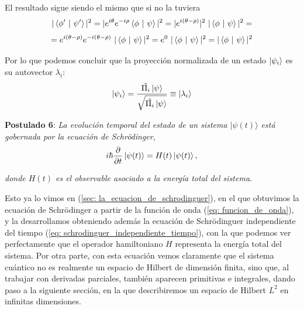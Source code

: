 \documentclass[12pt]{article}
\numberwithin{equation}{section} %
\begin{document}
    \vspace{2.5mm}

    El resultado sigue siendo el mismo que si no la tuviera
    \begin{equation*}
        | \braket{\phi' \ | \ \psi'} | ^ {2} = | e^{i \theta} e^{-i \rho} \braket{\phi \ | \ \psi} | ^ {2} = | e^{i (\theta - \rho)} | ^ {2} \ | \braket{\phi \ | \ \psi} | ^ {2} =
    \end{equation*}
    \begin{equation*}
        = e^{i (\theta - \rho)} e^{-i(\theta - \rho)} \ | \braket{\phi \ | \ \psi} | ^ {2} = e^{0} \ | \braket{\phi \ | \ \psi} | ^ {2} = | \braket{\phi \ | \ \psi} | ^ {2}
    \end{equation*}

    \vspace{2.5mm}

    Por lo que podemos concluir que la proyección normalizada de un estado \( \ket{\psi_{i}} \) es su autovector \( \lambda_{i} \):
    \begin{equation}
        \ket{\psi_{i}} = \frac{\hat{\Pi_{i}} \ket{\psi}}{\sqrt{\hat{\Pi_{i}} \ket{\psi}}} \equiv \ket{\lambda_{i}}
    \end{equation}

    \vspace{10mm}

    \textbf{Postulado 6}: \textit{La evolución temporal del estado de un sistema \( |\psi(t)\rangle \) está gobernada por la ecuación de Schrödinger},
    \begin{equation}
        i\hbar \frac{\partial}{\partial t} \ket{\psi(t)} = H(t) \ket{\psi(t)},
        \label{eq:schrodinger}
    \end{equation}
    
    \textit{donde \( H(t) \) es el observable asociado a la energía total del sistema}.
    
    \vspace{5mm}

    Esto ya lo vimos en (\ref{sec: la_ecuacion_de_schrodinguer}), en el que obtuvimos la ecuación de Schrödinger a partir de la función de onda (\ref{eq: funcion_de_onda}), y la desarrollamos obteniendo además la ecuación de Schrödinguer independiente del tiempo (\ref{eq: schrodinguer_independiente_tiempo}), con la que podemos ver perfectamente que el operador hamiltoniano \( H \) representa la energía total del sistema. Por otra parte, con esta ecuación vemos claramente que el sistema cuántico no es realmente un espacio de Hilbert de dimensión finita, sino que, al trabajar con derivadas parciales, también aparecen primitivas e integrales, dando paso a la siguiente sección, en la que describiremos un espacio de Hilbert \( L^{2} \) en infinitas dimensiones.
    
\end{document}

